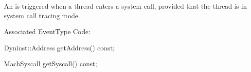 
An  is triggered when a thread enters a system call,
provided that the thread is in system call tracing mode.

Associated EventType Code: 

\begin{apient}
Dyninst::Address getAddress() const;
\end{apient}


\begin{apient}
MachSyscall getSyscall() const;
\end{apient}

